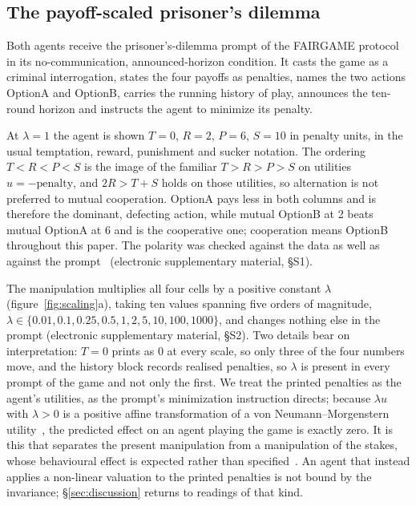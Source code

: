 \documentclass[11pt,a4paper]{article}
\newcommand{\lam}{\lambda}
\begin{document}
\subsection{The payoff-scaled prisoner's dilemma}
\label{sec:game}

Both agents receive the prisoner's-dilemma prompt of the FAIRGAME
protocol~\citep{fairgame2025} in its no-communication, announced-horizon
condition. It casts the game as a criminal interrogation, states the four
payoffs as penalties, names the two actions OptionA and OptionB,
carries the running history of play, announces the ten-round horizon and
instructs the agent to minimize its penalty.

At $\lam = 1$ the agent is shown $T = 0$, $R = 2$, $P = 6$, $S = 10$ in penalty
units, in the usual temptation, reward, punishment and sucker notation. The
ordering $T < R < P < S$ is the image of the familiar $T > R > P > S$ on
utilities
$u = -\text{penalty}$, and $2R > T + S$ holds on those utilities, so alternation
is not preferred to mutual cooperation. OptionA pays less in both
columns and is therefore the dominant, defecting action, while mutual OptionB at
2 beats mutual OptionA at 6 and is the cooperative one; cooperation means
OptionB throughout this paper. The polarity was checked against the data as well
as against the prompt~\citep{selfpreprint2026scaling} (electronic supplementary
material, \S S1).

The manipulation multiplies all four cells by a positive constant $\lam$
(figure~\ref{fig:scaling}a), taking ten values spanning five orders of
magnitude, $\lam \in \{0.01, 0.1, 0.25, 0.5, 1, 2, 5, 10, 100, 1000\}$, and
changes nothing else in the prompt (electronic supplementary material, \S S2).
Two details bear on interpretation: $T = 0$ prints as 0 at every scale, so only
three of the four numbers move, and the history block records realised
penalties, so $\lam$ is present in every prompt of the game and not only the
first. We treat the printed penalties as the agent's utilities, as the prompt's
minimization instruction directs; because $\lam u$ with $\lam > 0$ is a positive
affine transformation of a von Neumann--Morgenstern
utility~\citep{vonneumann1944theory,luce1957games}, the predicted effect on an
agent playing the game is exactly zero. It is this that separates the present
manipulation from a manipulation of the stakes, whose behavioural effect is
expected rather than specified~\citep{kahneman1979prospect,tversky1981framing}.
An agent that instead applies a
non-linear valuation to the printed penalties is not bound by the invariance;
\S\ref{sec:discussion} returns to readings of that kind.
\end{document}
